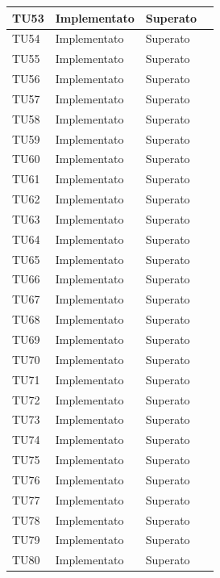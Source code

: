 \begin{longtable}{|>{\centering\arraybackslash}m{1.6cm}|>{\centering\arraybackslash}m{6.41cm}|>{\centering\arraybackslash}m{3.1cm}| c |}
		\rowcolor{LightGray}
	TU53 & Implementato & Superato  \\ \hline
	TU54 & Implementato & Superato  \\ \hline
		\rowcolor{LightGray}
	TU55 & Implementato & Superato  \\ \hline
	TU56 & Implementato & Superato  \\ \hline
		\rowcolor{LightGray}
	TU57 & Implementato & Superato  \\ \hline
	TU58 & Implementato & Superato  \\ \hline
		\rowcolor{LightGray}
	TU59 & Implementato & Superato  \\ \hline
	TU60 & Implementato & Superato  \\ \hline
		\rowcolor{LightGray}
	TU61 & Implementato & Superato  \\ \hline
	TU62 & Implementato & Superato  \\ \hline
		\rowcolor{LightGray}
	TU63 & Implementato & Superato  \\ \hline
	TU64 & Implementato & Superato  \\ \hline
		\rowcolor{LightGray}
	TU65 & Implementato & Superato  \\ \hline
	TU66 & Implementato & Superato  \\ \hline
		\rowcolor{LightGray}
	TU67 & Implementato & Superato  \\ \hline
	TU68 & Implementato & Superato  \\ \hline
		\rowcolor{LightGray}
	TU69 & Implementato & Superato  \\ \hline
	TU70 & Implementato & Superato  \\ \hline
		\rowcolor{LightGray}
	TU71 & Implementato & Superato  \\ \hline
	TU72 & Implementato & Superato  \\ \hline
		\rowcolor{LightGray}
	TU73 & Implementato & Superato  \\ \hline
	TU74 & Implementato & Superato  \\ \hline
		\rowcolor{LightGray}
	TU75 & Implementato & Superato  \\ \hline
	TU76 & Implementato & Superato  \\ \hline
		\rowcolor{LightGray}
	TU77 & Implementato & Superato  \\ \hline
	TU78 & Implementato & Superato  \\ \hline
		\rowcolor{LightGray}
	TU79 & Implementato & Superato  \\ \hline
	TU80 & Implementato & Superato  \\ \hline

\end{longtable}
